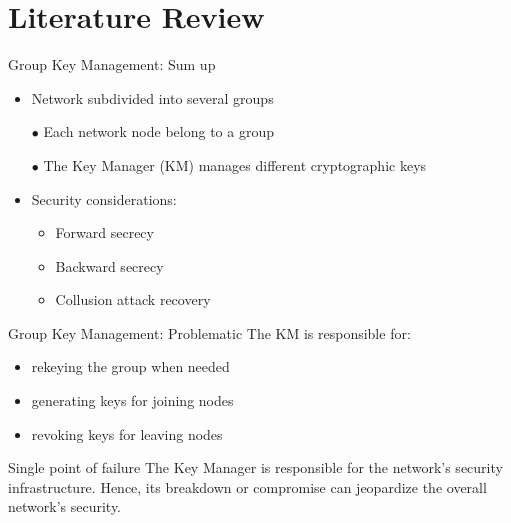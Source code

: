 \documentclass{beamer}
\begin{document}
\section{Literature Review}

\begin{frame}{Group Key Management: Sum up}
	\begin{itemize}
		\item Network subdivided into several groups
		\item[$\bullet$] Each network node belong to a group
		\item[$\bullet$] The Key Manager (KM) manages different cryptographic keys
		\item Security considerations:
		\begin{itemize}
			\item Forward secrecy
			\item Backward secrecy
			\item Collusion attack recovery
		\end{itemize}
	\end{itemize}
\end{frame}

\begin{frame}{Group Key Management: Problematic}
	The KM is responsible for:
	\begin{itemize}
		\item rekeying the group when needed
		\item generating keys for joining nodes
		\item revoking keys for leaving nodes
	\end{itemize}
	\pause
	\vfill
	\begin{alertblock}{Single point of failure}
		The Key Manager is responsible for the network's security infrastructure. Hence, its breakdown or compromise can jeopardize the overall network's security.
	\end{alertblock}
\end{frame}
\end{document}
